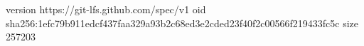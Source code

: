 version https://git-lfs.github.com/spec/v1
oid sha256:1efc79b911edcf437faa329a93b2c68ed3e2cded23f40f2c00566f219433fc5c
size 257203
